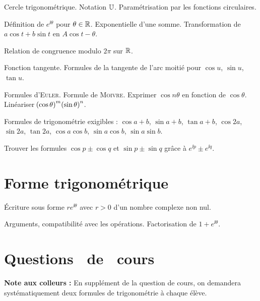 \documentclass[a4paper,french,bookmarks]{book}
\renewcommand{\questionsdecours}{\section*{\centering\EBGaramond\Large Questions~ de~ cours}}
\begin{document}
    \begin{enumerate}
        \ithand Cercle trigonométrique. Notation $\mathbb{U}$. Paramétrisation par les fonctions circulaires.
        
        \ithand Définition de $e^{\ii\theta}$ pour $\theta \in \mathbb{R}$. Exponentielle d'une somme. Transformation de $a \cos t + b\sin t$ en $A\cos{t - \theta}$.
        
        \ithand Relation de congruence modulo $2\pi$ sur $\mathbb{R}$.
        
        \ithand Fonction tangente. Formules de la tangente de l'arc moitié pour $\cos u$, $\sin u$, $\tan u$.
        
        \ithand Formules d'\textsc{Euler}. Formule de \textsc{Moivre}. Exprimer $\cos{n\theta}$ en fonction de $\cos \theta$. Linéariser $\!\left(\cos \theta\right)^m\!\left(\sin \theta\right)^n$.
        
        \ithand Formules de trigonométrie exigibles : $\cos{a + b}$, $\sin{a + b}$, $\tan{a + b}$, $\cos{2a}$, $\sin{2a}$, $\tan{2a}$, $\cos a\cos b$, $\sin a\cos b$, $\sin a\sin b$.
        
        \ithand Trouver les formules $\cos p \pm \cos q$ et $\sin p \pm \sin q$ grâce à $e^{\ii p} \pm e^{\ii q}$.
    \end{enumerate}
    
    \section*{Forme trigonométrique}
    
    \begin{enumerate}
        \ithand Écriture sous forme $re^{\ii \theta}$ avec $r > 0$ d'un nombre complexe non nul.
        
        \ithand Arguments, compatibilité avec les opérations. Factorisation de $1 + e^{\ii \theta}$.
    \end{enumerate}
    
    \questionsdecours
    
    \begin{center}
        \begin{minipage}{0.8\linewidth}
            \begin{tcolorbox}[
                breakable,
                enhanced,
                frame hidden,
                interior style      = {left color=main4!15,right color=main2!12},
                sharp corners       = downhill,
                arc                 = 0 cm,
                boxrule             = 0.5pt,
                drop fuzzy shadow   = black!40!white,
                nobeforeafter,
            ]
                \textbf{\sffamily Note aux colleurs :} En supplément de la question de cours, on demandera systématiquement deux formules de trigonométrie à chaque élève.
            \end{tcolorbox}
        \end{minipage}
    \end{center}
    
\end{document}
